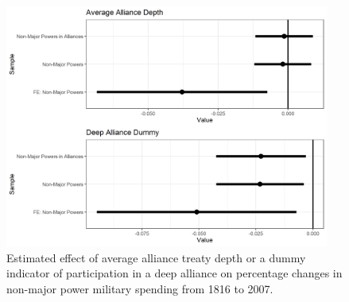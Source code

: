 \documentclass[12pt]{article}
\begin{document}
\begin{figure}[htbp]
	\centering
		\includegraphics[width=0.95\textwidth]{single-level-mplot.png}
	\caption{Estimated effect of average alliance treaty depth or a dummy indicator of participation in a deep alliance on percentage changes in non-major power military spending from 1816 to 2007.}
	\label{fig:single-level-mplot}
\end{figure}

%
%
%
%
%
\end{document}
